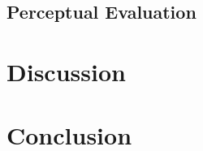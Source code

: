 \documentclass[11pt, letterpaper]{article}
\begin{document}
\subsection{Perceptual Evaluation}

\section{Discussion}
\label{sec:discussion}

\section{Conclusion}
\label{sec:conclusion}



\end{document}

